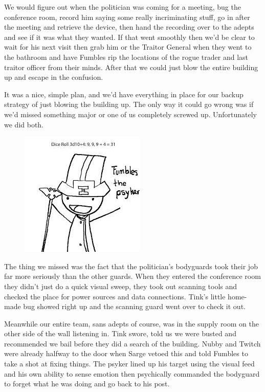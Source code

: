 We would figure out when the politician was coming for a meeting, bug the conference room, record him saying some really incriminating stuff, go in after the meeting and retrieve the device, then hand the recording over to the adepts and see if it was what they wanted. 
If that went smoothly then we'd be clear to wait for his next visit then grab him or the Traitor General when they went to the bathroom and have Fumbles rip the locations of the rogue trader and last traitor officer from their minds. 
After that we could just blow the entire building up and escape in the confusion. 


It was a nice, simple plan, and we'd have everything in place for our backup strategy of just blowing the building up. 
The only way it could go wrong was if we'd missed something major or one of us completely screwed up. 
Unfortunately we did both.

\begin{figure}
	\begin{center}
		\includegraphics[width=\figwidth]{pics/10/51.png}
	\end{center}
\end{figure}
The thing we missed was the fact that the politician's bodyguards took their job far more seriously than the other guards. 
When they entered the conference room they didn't just do a quick visual sweep, they took out scanning tools and checked the place for power sources and data connections. 
Tink's little home-made bug showed right up and the scanning guard went over to check it out. 


Meanwhile our entire team, sans adepts of course, was in the supply room on the other side of the wall listening in. 
Tink swore, told us we were busted and recommended we bail before they did a search of the building. 
Nubby and Twitch were already halfway to the door when Sarge vetoed this and told Fumbles to take a shot at fixing things. 
The psyker lined up his target using the visual feed and his own ability to sense emotion then psychically commanded the bodyguard to forget what he was doing and go back to his post. 


